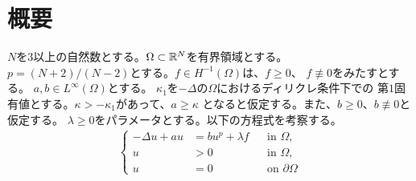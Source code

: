 \section{概要}

$N$を$3$以上の自然数とする。$\Omega \subset \mathbb{R}^N$を有界領域とする。
$p = (N+2)/(N-2)$とする。$f \in H^{-1}(\Omega)$は、$f \geq 0$、
$f \not \equiv 0$をみたすとする。
$a, b \in L^\infty(\Omega)$とする。
$\kappa_1$を$-\Delta$の$\Omega$におけるディリクレ条件下での
第$1$固有値とする。$\kappa > - \kappa_1$があって、$a \geq \kappa$
となると仮定する。また、$b \geq 0$、$b \not \equiv 0$と仮定する。
$\lambda \geq 0$をパラメータとする。以下の方程式を考察する。
\begin{align}
 \left\{
 \begin{aligned}
  -\Delta u + a u &= b u^p + \lambda f  & &\text{in~} \Omega,  \\
  u &> 0 & &\text{in~} \Omega, \\
  u &= 0 & &\text{on~} \partial\Omega
 \end{aligned}
 \right. \tag*{$(\star)_\lambda$} \label{eq:prob_main}
\end{align}
